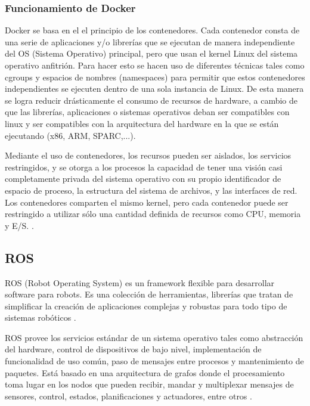 		\subsubsection{Funcionamiento de Docker}
		Docker se basa en el el principio de los contenedores. Cada contenedor consta de una serie de aplicaciones y/o librerías que se ejecutan de manera independiente del OS (Sistema Operativo) principal, pero que usan el kernel Linux del sistema operativo anfitrión. Para hacer esto se hacen uso de diferentes técnicas tales como cgroups y espacios de nombres (namespaces) para permitir que estos contenedores independientes se ejecuten dentro de una sola instancia de Linux. De esta manera se logra reducir drásticamente el consumo de recursos de hardware, a cambio de que las librerías, aplicaciones o sistemas operativos deban ser compatibles con linux y ser compatibles con la arquitectura del hardware en la que se están ejecutando (x86, ARM, SPARC,...).
		
		Mediante el uso de contenedores, los recursos pueden ser aislados, los servicios restringidos, y se otorga a los procesos la capacidad de tener una visión casi completamente privada del sistema operativo con su propio identificador de espacio de proceso, la estructura del sistema de archivos, y las interfaces de red. Los contenedores comparten el mismo kernel, pero cada contenedor puede ser restringido a utilizar sólo una cantidad definida de recursos como CPU, memoria y E/S. \cite{docker-wikipedia}.

	\subsection{ROS}
	ROS (Robot Operating System) es un framework flexible para desarrollar software para robots. Es una colección de herramientas, librerías que tratan de simplificar la creación de aplicaciones complejas y robustas para todo tipo de sistemas robóticos \cite{ros-web}.
	
	ROS provee los servicios estándar de un sistema operativo tales como abstracción del hardware, control de dispositivos de bajo nivel, implementación de funcionalidad de uso común, paso de mensajes entre procesos y mantenimiento de paquetes. Está basado en una arquitectura de grafos donde el procesamiento toma lugar en los nodos que pueden recibir, mandar y multiplexar mensajes de sensores, control, estados, planificaciones y actuadores, entre otros \cite{ros-wikipedia}.


